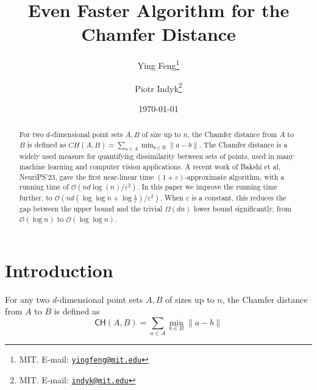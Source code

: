 \documentclass[11pt]{article}
\newcommand{\eps}{\varepsilon}
\DeclarePairedDelimiter\ceil{\lceil}{\rceil}
\DeclarePairedDelimiter\floor{\lfloor}{\rfloor}
\theoremstyle{plain}
\newcommand{\OO}{\mathcal{O}}
\providecommand{\email}[1]{\href{mailto:#1}{\nolinkurl{#1}\xspace}}
\begin{document}
\newcommand{\tikzxmark}{\tikz[scale=0.23] {
    \draw[line width=0.7,line cap=round] (0,0) to [bend left=6] (1,1);
    \draw[line width=0.7,line cap=round] (0.2,0.95) to [bend right=3] (0.8,0.05);
}}
\DeclarePairedDelimiter\ceil{\lceil}{\rceil}
\DeclarePairedDelimiter\floor{\lfloor}{\rfloor}


\renewcommand{\subparagraph}[1]{\medskip\noindent\underline{\textit{#1}}}

\title{Even Faster Algorithm for the Chamfer
Distance}
\author{Ying Feng\thanks{MIT. 
E-mail: \email{yingfeng@mit.edu}}
\and
Piotr Indyk\thanks{MIT. 
E-mail: \email{indyk@mit.edu}}
}
\date{\today}
\maketitle









\begin{abstract}
For two $d$-dimensional point sets $A,B$  of size up to $n$, the Chamfer distance from $A$ to $B$ is defined as $CH(A,B)=\sum_{a \in A} \min_{b \in B} \|a-b\|$.
 The Chamfer distance is a widely used measure for quantifying dissimilarity between sets of points, used in many machine learning and computer vision applications. A recent work of Bakshi et al, NeuriPS'23, gave the first near-linear time $(1+\eps)$-approximate algorithm, with a running time of  $\OO(nd \log (n)/\eps^2)$. In this paper we improve the running time further,  to $\OO(nd(\log\log n+\log\frac{1}{\eps})/\eps^2)$. 
  When $\eps$ is a constant, this reduces 
  the gap between the upper bound and the trivial $\Omega(dn)$ lower bound significantly, from $\OO(\log n)$ to $\OO(\log\log n)$. 
\end{abstract} 
\newpage

\section{Introduction}

For any two $d$-dimensional point sets $A,B$ of sizes up to $n$, the Chamfer distance from $A$ to $B$ is defined as 
\newcommand{\CH}{\mathsf{CH}}
\begin{equation*}
\CH(A,B) = \sum_{a \in A} \min_{b \in B} \|a-b\|
\end{equation*}
\end{document}
